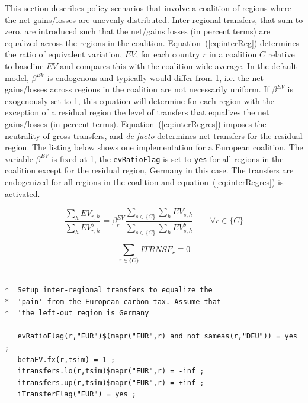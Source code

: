 \documentclass[11pt,letterpaper]{report}
\begin{document}
This section describes policy scenarios that involve a coalition
of regions where the net gains/losses are unevenly distributed.
Inter-regional transfers, that sum to zero, are introduced such that the net/gains
losses (in percent terms) are equalized across the regions in the coalition. Equation~(\ref{eq:interReg}) determines the ratio
of equivalent variation, $\mathit{EV}$, for each country $r$ in a coalition $C$
relative to baseline $\mathit{EV}$ and compares this
with the coalition-wide average. In the default model, $\beta^{\mathit{EV}}$
is endogenous and typically would differ from 1, i.e. the net gains/losses across regions in the coalition are not necessarily uniform.
If $\beta^{\mathit{EV}}$ is exogenously set to 1, this equation
will determine for each region with the exception of a residual region
the level of transfers that equalizes the net gains/losses (in
percent terms). Equation~(\ref{eq:interRegres}) imposes the neutrality
of gross transfers, and \emph{de facto} determines net transfers for
the residual region. The listing below shows one implementation
for a European coalition. The variable $\beta^{\mathit{EV}}$ is fixed at 1,
the \texttt{evRatioFlag} is set to \texttt{yes} for all regions
in the coalition except for the residual region, Germany in this case. The transfers
are endogenized for all regions in the coalition and equation~(\ref{eq:interRegres})
is activated.

\begin{equation}
\label{eq:interReg}
\frac {\displaystyle  \sum_h{\mathit{EV}_{r,h}}} {\displaystyle \sum_h{\mathit{EV}^b_{r,h}}}
= \beta^{\mathit{EV}}_r
\frac {\displaystyle \sum_{s \in \{C\}} {\sum_h{\mathit{EV}_{s,h}}}} {\displaystyle \sum_{s \in \{C\}} {\sum_h{\mathit{EV}^b_{s,h}}}} \qquad \forall r \in \{C\}
\end{equation}

\begin{equation}
\label{eq:interRegres}
\sum_{r \in \{C\}}{\mathit{ITRNSF}_r} \equiv 0
\end{equation}

\begin{lstlisting}[language=GAMS,
	caption={Neutral inter-regional transfers}, label=lst:TrClosure]

*  Setup inter-regional transfers to equalize the
*  'pain' from the European carbon tax. Assume that
*  'the left-out region is Germany

   evRatioFlag(r,"EUR")$(mapr("EUR",r) and not sameas(r,"DEU")) = yes ;
   betaEV.fx(r,tsim) = 1 ;
   itransfers.lo(r,tsim)$mapr("EUR",r) = -inf ;
   itransfers.up(r,tsim)$mapr("EUR",r) = +inf ;
   iTransferFlag("EUR") = yes ;

\end{lstlisting}
\end{document}
